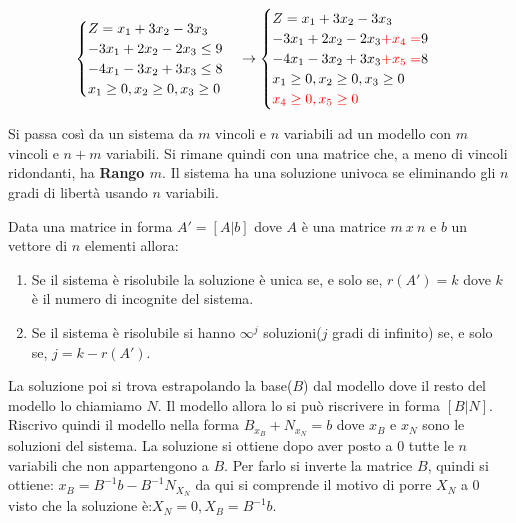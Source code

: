 \documentclass{article}
\begin{document}
$$
  \begin{cases}
    Z = x_1 + 3x_2 - 3x_3     \\
    -3x_1 + 2x_2 - 2x_3 \le 9 \\
    -4x_1 - 3x_2 + 3x_3 \le 8 \\
    x_1 \ge 0,
    x_2 \ge 0,
    x_3 \ge 0
  \end{cases}
  \to
  \begin{cases}
    Z = x_1 + 3x_2 - 3x_3                         \\
    -3x_1 + 2x_2 - 2x_3 \textcolor{red}{+x_4 =} 9 \\
    -4x_1 - 3x_2 + 3x_3 \textcolor{red}{+x_5 =} 8 \\
    x_1 \ge 0,
    x_2 \ge 0,
    x_3 \ge 0                                     \\
    \textcolor{red}{x_4 \ge 0, x_5 \ge 0}
  \end{cases}
$$

Si passa così da un sistema da $m$ vincoli e $n$ variabili ad un modello con $m$ vincoli e $n+m$ variabili. Si rimane quindi con una matrice che, a meno di vincoli ridondanti, ha \textbf{Rango $m$}. Il sistema ha una soluzione univoca se eliminando gli $n$ gradi di libertà usando $n$ variabili.

\begin{tcolorbox}[
    colback=lightgray,
    colframe=black,
    coltext=black,
    title=Teorema di Rouché Capelli,
    colbacktitle=black,
    coltitle=lightgray,
    breakable
  ]
  Data una matrice in forma $A'=[A|b]$ dove $A$ è una matrice $m\ x\ n$ e $b$ un vettore di $n$ elementi allora:
  \begin{enumerate}
    \item Se il sistema è risolubile la soluzione è unica se, e solo se, $r(A')=k$ dove $k$ è il numero di incognite del sistema.
    \item Se il sistema è risolubile si hanno $\infty^j$ soluzioni($j$ gradi di infinito) se, e solo se, $j=k-r(A')$.
  \end{enumerate}
\end{tcolorbox}

La soluzione poi si trova estrapolando la base($B$) dal modello dove il resto del modello lo chiamiamo $N$. Il modello allora lo si può riscrivere in forma $[B|N]$. Riscrivo quindi il modello nella forma $B_{x_B}+N_{x_N}=b$ dove $x_B$ e $x_N$ sono le soluzioni del sistema. La soluzione si ottiene dopo aver posto a $0$ tutte le $n$ variabili che non appartengono a $B$. Per farlo si inverte la matrice $B$, quindi si ottiene: $x_B=B^{-1}b-B^{-1}N_{X_N}$ da qui si comprende il motivo di porre $X_N$ a $0$ visto che la soluzione è:$X_N=0, X_B = B^{-1}b$.
\end{document}
